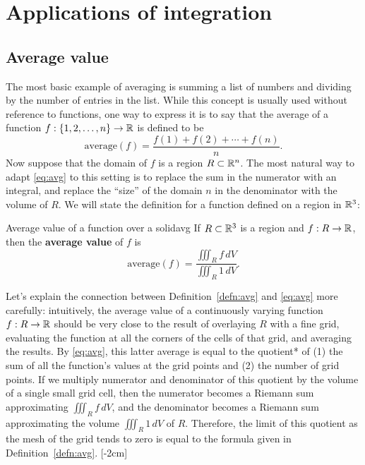 \documentclass{watsonbook}
\begin{document}
\section{Applications of integration} \label{sec:applications}

\subsection{Average value}

The most basic example of averaging is summing a list of numbers and
dividing by the number of entries in the list. While this concept is
usually used without reference to functions, one way to express it is
to say that the average of a function
$f:\{1,2,\ldots,n\} \rightarrow \mathbb{R}$ is defined to be 
\begin{equation} \label{eq:avg} 
  \mathrm{average}(f) = \frac{f(1) + f(2) + \cdots + f(n)}{n}. 
\end{equation}
Now suppose that the domain of $f$ is a region $R\subset \mathbb{R}^n$. The
most natural way to adapt \eqref{eq:avg} to this setting is to replace
the sum in the numerator with an integral, and replace the ``size'' of
the domain $n$ in the denominator with the volume of $R$. We will
state the definition for a function defined on a region in $\mathbb{R}^3$:

\begin{defn}{Average value of a function over a solid}{avg}
  If $R\subset \mathbb{R}^3$ is a region and $f: R \to \mathbb{R}$, then the \textbf{average value} of $f$ is
  \[
      \mathrm{average}(f) = \frac{\displaystyle{\iiint_R f \, dV}}{\displaystyle{\iiint_R 1 \, dV}}. 
  \]
\end{defn}

Let's explain the connection between Definition~\ref{defn:avg} and
\eqref{eq:avg} more carefully: intuitively, the average value of a
continuously varying function $f:R\to \mathbb{R}$ should be very close to the
result of overlaying $R$ with a fine grid, evaluating the function at
all the corners of the cells of that grid, and averaging the
results. By \eqref{eq:avg}, this latter average is equal to the
quotient* of (1) the sum of all the function's values at the grid
points and (2) the number of grid points. If we multiply numerator and
denominator of this quotient by the volume of a single small grid
cell, then the numerator becomes a Riemann sum approximating
$\iiint_R f \, dV$, and the denominator becomes a Riemann sum
approximating the volume $\iiint_R 1 \, dV$ of $R$. Therefore, the
limit of this quotient as the mesh of the grid tends to zero is equal
to the formula given in Definition~\ref{defn:avg}. [-2cm]
\end{document}
